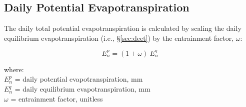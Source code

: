 \subsection{Daily Potential Evapotranspiration}
\label{sec:dpet}
The daily total potential evapotranspiration is calculated by scaling the daily equilibrium evapotranspiration (i.e., \S \ref{sec:deet}) by the entrainment factor, $\omega$:

\begin{equation}
\label{eq:daypet}
	E^p_n = \left(1 + \omega \right)\: E^q_n
\end{equation}

\noindent where:\\
\indent $E^p_n$ = daily potential evapotranspiration, mm\\
\indent $E^q_n$ = daily equilibrium evapotranspiration, mm\\
\indent $\omega$ = entrainment factor, unitless \\

